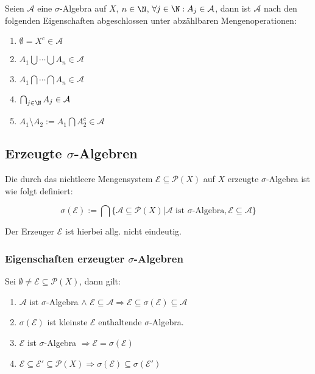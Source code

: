 Seien $\mathcal{A}$ eine $\sigma$-Algebra auf $X$, $n \in \N$, $\forall j \in \N : A_j \in \mathcal{A}$, dann ist $\mathcal{A}$ nach den folgenden Eigenschaften abgeschlossen unter abzählbaren Mengenoperationen:

\begin{enumerate}[label=(\alph*)]
	\item $\emptyset = X^c \in \mathcal{A}$
	\item $A_1 \bigcup \cdots \bigcup A_n \in \mathcal{A}$
	\item $A_1 \bigcap \cdots \bigcap A_n \in \mathcal{A}$
	\item $\bigcap_{j\in \N} A_j \in \mathcal{A}$
	\item $A_1 \setminus A_2 := A_1 \bigcap A_2^c \in \mathcal{A}$
\end{enumerate}

\subsection*{Erzeugte $\sigma$-Algebren}

Die durch das nichtleere Mengensystem $\mathcal{E} \subseteq \mathcal{P}(X)$ auf $X$ erzeugte $\sigma$-Algebra ist wie folgt definiert:

\vspace*{-4mm}
$$\sigma(\mathcal{E}) := \bigcap\{ \mathcal{A} \subseteq \mathcal{P}(X) | \mathcal{A} \text{ ist } \sigma \text{-Algebra}, \mathcal{E} \subseteq \mathcal{A} \}$$

Der Erzeuger $\mathcal{E}$ ist hierbei allg. nicht eindeutig.

\subsubsection*{Eigenschaften erzeugter $\sigma$-Algebren}

Sei $\emptyset \neq \mathcal{E} \subseteq \mathcal{P}(X)$, dann gilt:

\begin{enumerate}[label=(\alph*)]
	\item $\mathcal{A}$ ist $\sigma$-Algebra $\land$ $\mathcal{E} \subseteq \mathcal{A} \Rightarrow \mathcal{E} \subseteq \sigma(\mathcal{E}) \subseteq \mathcal{A}$
	\item $\sigma(\mathcal{E})$ ist kleinste $\mathcal{E}$ enthaltende $\sigma$-Algebra.
	\item $\mathcal{E}$ ist $\sigma$-Algebra $\Rightarrow \mathcal{E} = \sigma(\mathcal{E})$
	\item $\mathcal{E} \subseteq \mathcal{E}' \subseteq \mathcal{P}(X) \Rightarrow \sigma(\mathcal{E}) \subseteq \sigma(\mathcal{E}')$
\end{enumerate}

